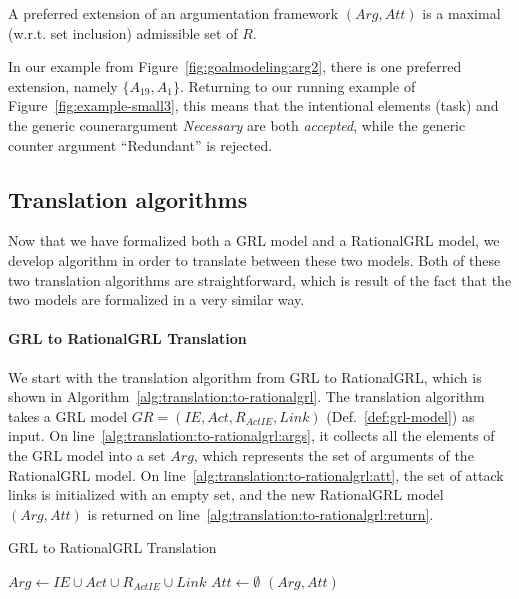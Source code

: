 \begin{definition} 
\label{def:preferred-semantics}
A preferred extension of an argumentation framework $(Arg,Att)$ is a maximal (w.r.t. set inclusion) admissible set of $R$.
\end{definition}

In our example from Figure~\ref{fig:goalmodeling:arg2}, there is one preferred extension, namely $\{A_{19},A_1\}$. Returning to our running example of Figure~\ref{fig:example-small3}, this means that the intentional elements  (task) and the generic counerargument \emph{Necessary} are both \emph{accepted}, while the generic counter argument ``Redundant'' is rejected.

\subsection{Translation algorithms}

Now that we have formalized both a GRL model and a RationalGRL model, we develop algorithm in order to translate between these two models. Both of these two translation algorithms are straightforward, which is result of the fact that the two models are formalized in a very similar way.

\paragraph{GRL to RationalGRL Translation} We start with the translation algorithm from GRL to RationalGRL, which is shown in Algorithm~\ref{alg:translation:to-rationalgrl}. The translation algorithm takes a GRL model $GR=(IE, Act, R_{ActIE}, Link)$ (Def.~\ref{def:grl-model}) as input. On line~\ref{alg:translation:to-rationalgrl:args}, it collects all the elements of the GRL model into a set $Arg$, which represents the set of arguments of the RationalGRL model. On line~\ref{alg:translation:to-rationalgrl:att}, the set of attack links is initialized with an empty set, and the new RationalGRL model $(Arg, Att)$ is returned on line~\ref{alg:translation:to-rationalgrl:return}.

\begin{algorithm}[h]
  \caption{GRL to RationalGRL Translation}
  \label{alg:translation:to-rationalgrl}
  \begin{algorithmic}[1]
    \State $Arg \leftarrow IE\cup Act \cup R_{ActIE}\cup Link$\label{alg:translation:to-rationalgrl:args}
    \State $Att \leftarrow \emptyset$\label{alg:translation:to-rationalgrl:att}
    \State \Return $(Arg, Att)$\label{alg:translation:to-rationalgrl:return}
    \EndProcedure
  \end{algorithmic}
\end{algorithm}

